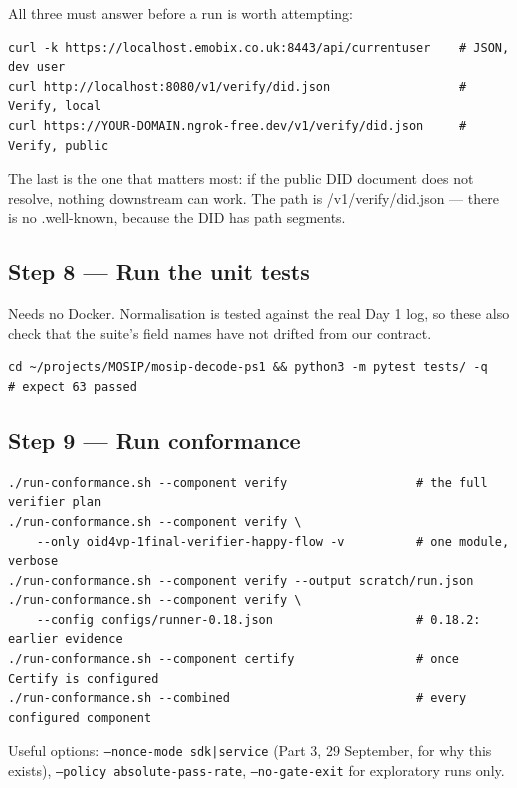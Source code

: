 \documentclass[10pt,a4paper]{article}
\begin{document}
All three must answer before a run is worth attempting:

\begin{verbatim}
curl -k https://localhost.emobix.co.uk:8443/api/currentuser    # JSON, dev user
curl http://localhost:8080/v1/verify/did.json                  # Verify, local
curl https://YOUR-DOMAIN.ngrok-free.dev/v1/verify/did.json     # Verify, public
\end{verbatim}

The last is the one that matters most: if the public DID document does not resolve,
nothing downstream can work. The path is /v1/verify/did.json --- there is no
.well-known, because the DID has path segments.

\subsection{Step 8 --- Run the unit tests}

Needs no Docker. Normalisation is tested against the real Day 1 log, so these also check
that the suite's field names have not drifted from our contract.

\begin{verbatim}
cd ~/projects/MOSIP/mosip-decode-ps1 && python3 -m pytest tests/ -q     # expect 63 passed
\end{verbatim}

\subsection{Step 9 --- Run conformance}

\begin{verbatim}
./run-conformance.sh --component verify                  # the full verifier plan
./run-conformance.sh --component verify \
    --only oid4vp-1final-verifier-happy-flow -v          # one module, verbose
./run-conformance.sh --component verify --output scratch/run.json
./run-conformance.sh --component verify \
    --config configs/runner-0.18.json                    # 0.18.2: earlier evidence
./run-conformance.sh --component certify                 # once Certify is configured
./run-conformance.sh --combined                          # every configured component
\end{verbatim}

Useful options: \texttt{--nonce-mode sdk|service} (Part 3, 29 September, for why this
exists), \texttt{--policy absolute-pass-rate}, \texttt{--no-gate-exit} for exploratory
runs only.
\end{document}
